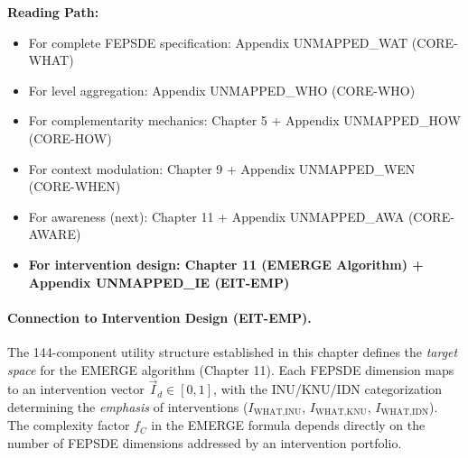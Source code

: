 \begin{cross-reference}
\textbf{Reading Path:}
\begin{itemize}
    \item For complete FEPSDE specification: Appendix UNMAPPED_WAT (CORE-WHAT)
    \item For level aggregation: Appendix UNMAPPED_WHO (CORE-WHO)
    \item For complementarity mechanics: Chapter 5 + Appendix UNMAPPED_HOW (CORE-HOW)
    \item For context modulation: Chapter 9 + Appendix UNMAPPED_WEN (CORE-WHEN)
    \item For awareness (next): Chapter 11 + Appendix UNMAPPED_AWA (CORE-AWARE)
    \item \textbf{For intervention design: Chapter 11 (EMERGE Algorithm) + Appendix UNMAPPED_IE (EIT-EMP)}
\end{itemize}
\end{cross-reference}

\paragraph{Connection to Intervention Design (EIT-EMP).}
The 144-component utility structure established in this chapter defines the \emph{target space}
for the EMERGE algorithm (Chapter 11). Each FEPSDE dimension maps to an intervention vector
$\vec{I}_d \in [0,1]$, with the INU/KNU/IDN categorization determining the \emph{emphasis}
of interventions ($I_{\text{WHAT},\text{INU}}$, $I_{\text{WHAT},\text{KNU}}$, $I_{\text{WHAT},\text{IDN}}$).
The complexity factor $f_C$ in the EMERGE formula depends directly on the number of FEPSDE
dimensions addressed by an intervention portfolio.

